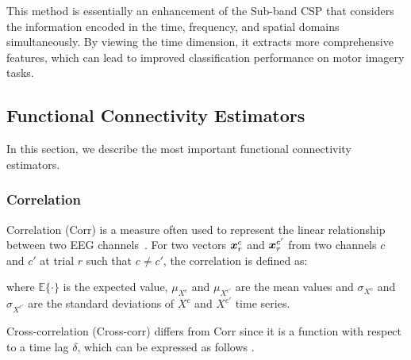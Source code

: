 This method is essentially an enhancement of the Sub-band CSP that considers the information encoded in the time, frequency, and spatial domains simultaneously. By viewing the time dimension, it extracts more comprehensive features, which can lead to improved classification performance on motor imagery tasks.


\subsection{Functional Connectivity Estimators}

In this section, we describe the most important functional connectivity estimators.

\subsubsection{Correlation}
Correlation (Corr) is a measure often used to represent the linear relationship between two EEG channels~\cite{fagerholm2020dynamic}. For two vectors $\bm {x}^{c}_{r}$ and $\bm {x}^{c'}_{r}$ from two channels $c$ and $c'$ at trial $r$ such that $c\neq c'$, the correlation is defined as:


where $\mathbb{E}\{\cdot\}$ is the expected value, $\mu_{X^{c}}$ and $\mu_{X^{c'}}$ are the mean values and $\sigma_{X^{c}}$ and $\sigma_{X^{c'}}$ are the standard deviations of $X^{c}$ and $X^{c'}$ time series.

Cross-correlation (Cross-corr) differs from Corr since it is a function with respect to a time lag $\delta$, which can be expressed as follows \cite{roy2022comparative}.


